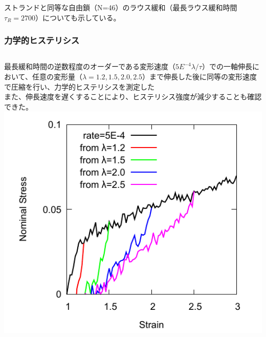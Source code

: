 \documentclass[11pt, dvipdfmx]{beamer}
\begin{document}
\begin{frame}
\begin{columns}[totalwidth=1\textwidth]
\end{columns}
ストランドと同等な自由鎖（N=46）のラウス緩和（最長ラウス緩和時間 $\tau_R = 2700$）についても示している。
\end{frame}
\begin{frame}
\frametitle{力学的ヒステリシス}
\begin{columns}[totalwidth=1\textwidth]
最長緩和時間の逆数程度のオーダーである変形速度（$5E^{-4}\lambda/\tau$）での一軸伸長において、任意の変形量（$\lambda = 1.2, 1.5, 2.0, 2.5$）まで伸長した後に同等の変形速度で圧縮を行い、力学的ヒステリシスを測定した\\
また、伸長速度を遅くすることにより、ヒステリシス強度が減少することも確認できた。
\centering
\includegraphics[width=\textwidth]{./fig/N44_rev_SS.pdf}
\end{columns}
\end{frame}
\end{document}
